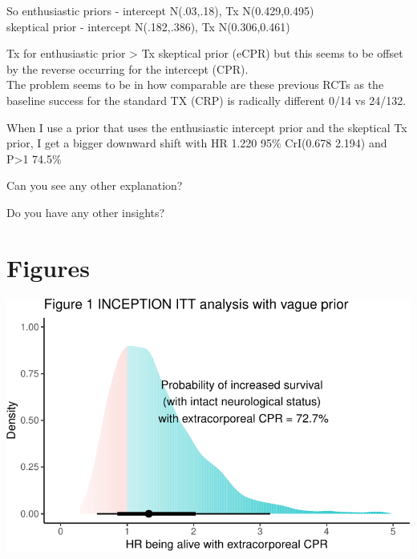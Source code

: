\documentclass[
  super,
  preprint,
  3p]{elsarticle}
\begin{document}
So enthusiastic priors - intercept N(.03,.18), Tx N(0.429,0.495)\\
skeptical prior - intercept N(.182,.386), Tx N(0.306,0.461)

Tx for enthusiastic prior \textgreater{} Tx skeptical prior (eCPR) but
this seems to be offset by the reverse occurring for the intercept
(CPR).\\
The problem seems to be in how comparable are these previous RCTs as the
baseline success for the standard TX (CRP) is radically different 0/14
vs 24/132.

When I use a prior that uses the enthusiastic intercept prior and the
skeptical Tx prior, I get a bigger downward shift with HR 1.220 95\%
CrI(0.678 2.194) and P\textgreater1 74.5\%

Can you see any other explanation?

Do you have any other insights?

\hypertarget{figures}{%
\section{Figures}\label{figures}}

\includegraphics{manuscript_files/figure-pdf/unnamed-chunk-4-1.pdf}

\newpage


\renewcommand\refname{References}
  
\end{document}
